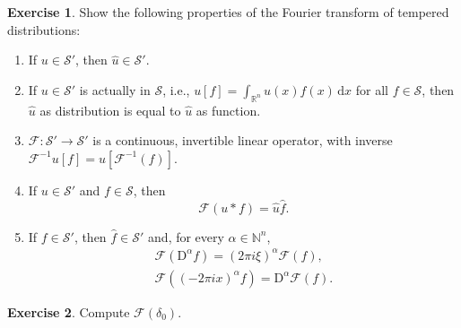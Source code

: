 \documentclass[a4paper,9pt]{amsart}
\newcommand{\scr}[1]{\mathscr{#1}}
\newcommand{\N}{\mathbb{N}}	%
\newcommand{\R}{\mathbb{R}}	%
\newcommand{\did}{\,\mathrm{d}}	%
\newcommand{\Diff}{\mathrm{D}}
\newcommand{\TODO}{{\bf\color{Red}TODO}}
\theoremstyle{plain}
\newtheorem{proposition}{Proposition}[section]
\theoremstyle{definition}
\newtheorem{exercise}[proposition]{Exercise}%
\theoremstyle{remark}
\begin{document}
\begin{exercise}
	Show the following properties of the Fourier transform of tempered distributions:
	\begin{enumerate}
	\item
	If $u\in\scr S'$, then $\hat u\in\scr S'$.
	\item
	If $u\in\scr S'$ is actually in $\scr S$, i.e., $u[f] = \int_{\R^n} u(x) f(x) \did x$ for all $f\in\scr S$, then $\hat u$ as distribution is equal to $\hat u$ as function.
	\item
	$\scr F:\scr S'\to\scr S'$ is a continuous, invertible linear operator, with inverse
	$\scr F^{-1}u[f] = u[\scr F^{-1}(f)]$.
	\item
	If $u\in\scr S'$ and $f\in\scr S$, then 
	\begin{equation}\label{eq680350a7}
		\scr F(u*f) = \hat u \hat f .
	\end{equation}
	\item
	If $f \in\scr S'$, then $\hat f\in\scr S'$ and, for every $\alpha\in\N^n$,
	\begin{gather}
	\label{eq67fe65d6}
		\scr F(\Diff^\alpha f) = (2\pi i\xi)^\alpha \scr F(f) ,\\
	\label{eq67fe65da}
		\scr F( (-2\pi ix)^\alpha f) = \Diff^\alpha\scr F(f) .
	\end{gather}
	\end{enumerate}
\end{exercise}


\begin{exercise}\label{ex67fcc1d2}
	Compute $\scr F(\delta_0)$.
\end{exercise}
\end{document}
